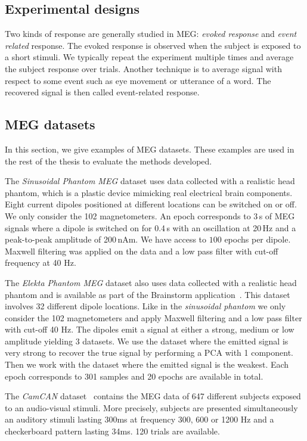 \subsection{Experimental designs}
Two kinds of response are generally studied in MEG: \emph{evoked response} and
\emph{event related} response.
The evoked response is observed when the subject is exposed to a short stimuli.
We typically repeat the experiment multiple times and average the subject
response over trials.
Another technique is to average signal with respect to some event such as eye
movement or utterance of a word. The recovered signal is then called
event-related response.

\subsection{MEG datasets}
\label{sec:meg:datasets}
In this section, we give examples of MEG datasets. These examples are used in
the rest of the thesis to evaluate the methods developed.

The \emph{Sinusoidal Phantom MEG} dataset uses data collected with a realistic head phantom, which is a plastic device mimicking real electrical brain components.
% 
Eight current dipoles positioned at different locations can be switched on or off.
% 
We only consider the 102 magnetometers.
% 
An epoch corresponds to 3\,s of MEG signals where a dipole is switched on for 0.4\,s with an oscillation at 20\,Hz and a peak-to-peak amplitude of 200\,nAm.
% 
We have access to $100$ epochs per dipole.
%
Maxwell filtering was applied on the data and a low pass filter with cut-off
frequency at 40 Hz.

The \emph{Elekta Phantom MEG} dataset also uses data collected with a realistic
head phantom and is available as part of the Brainstorm
application~\cite{tadel2011brainstorm}.
This dataset involves 32 different dipole locations. Like in the
\emph{sinusoidal phantom} we only
consider the 102 magnetometers and apply Maxwell filtering and a low pass filter
with cut-off 40 Hz. The dipoles emit a signal at either a strong, medium or low
amplitude yielding 3 datasets.
We use the dataset where the emitted signal is very strong to recover the true signal
by performing a PCA with 1 component.
Then we work with the dataset where the emitted signal is the weakest.
Each epoch corresponds to 301 samples and 20 epochs are available in total.

The \emph{CamCAN} dataset~\cite{shafto2014cambridge}
contains the MEG data of 647 different
subjects exposed to an audio-visual stimuli. More precisely, subjects are presented simultaneously an
auditory stimuli lasting 300ms at frequency 300, 600 or 1200 Hz  and a
checkerboard pattern lasting 34ms. 120 trials are available.

